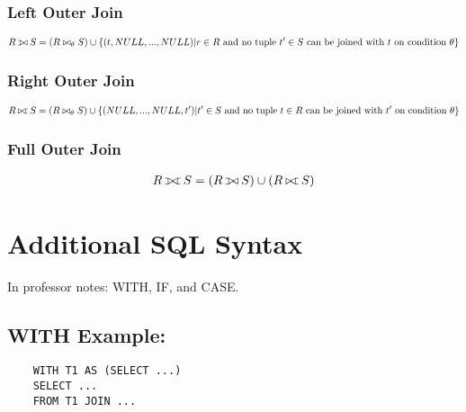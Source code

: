 \documentclass[twoside]{article}
\def\ojoin{\setbox0=\hbox{$\bowtie$}%
  \rule[-.02ex]{.25em}{.4pt}\llap{\rule[\ht0]{.25em}{.4pt}}}
\def\leftouterjoin{\mathbin{\ojoin\mkern-5.8mu\bowtie}}
\def\rightouterjoin{\mathbin{\bowtie\mkern-5.8mu\ojoin}}
\def\fullouterjoin{\mathbin{\ojoin\mkern-5.8mu\bowtie\mkern-5.8mu\ojoin}}
\begin{document}
\subsubsection*{Left Outer Join}
\begin{gather*}
    R \leftouterjoin S = (R \bowtie_{\theta} S) \cup \{(t, NULL, ..., NULL) | 
    r \in R \text{ and no tuple } t' \in S \text{ can be joined with } t \text{ 
    on condition } \theta\} 
\end{gather*}

\subsubsection*{Right Outer Join}
\begin{gather*}
    R \rightouterjoin S = (R \bowtie_{\theta} S) \cup \{(NULL, ..., NULL, t') |
    t' \in S \text{ and no tuple } t \in R \text{ can be joined with } t' \text{
    on condition } \theta\}
\end{gather*}

\subsubsection*{Full Outer Join}
\begin{gather*}
    R \fullouterjoin S = (R \leftouterjoin S) \cup (R \rightouterjoin S)
\end{gather*}

\section*{Additional SQL Syntax}
In professor notes: WITH, IF, and CASE.

\subsection*{WITH Example:}
\begin{verbatim}
    WITH T1 AS (SELECT ...)
    SELECT ...
    FROM T1 JOIN ...
\end{verbatim}
\end{document}
